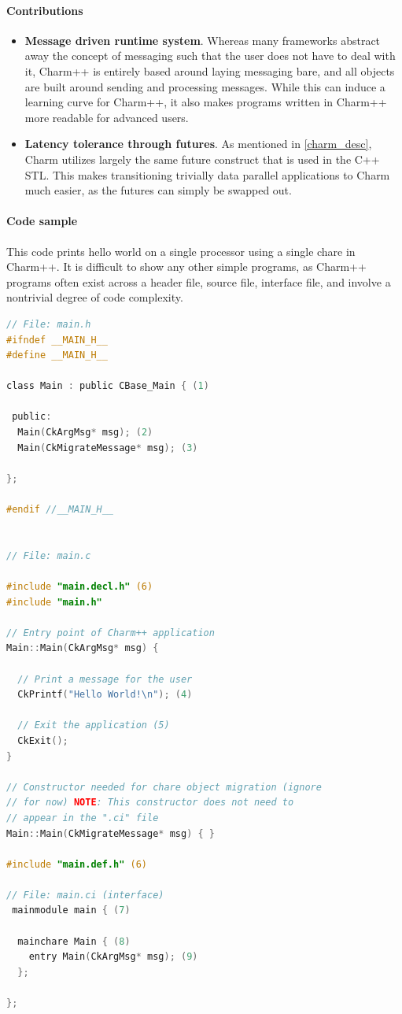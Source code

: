\paragraph{Contributions}
	\begin{itemize}
		\item \textbf{Message driven runtime system}. Whereas many frameworks abstract away the concept of messaging such that the user does not have to deal with it, Charm++ is entirely based around laying messaging bare, and all objects are built around sending and processing messages. While this can induce a learning curve for Charm++, it also makes programs written in Charm++ more readable for advanced users.  
		\item \textbf{Latency tolerance through futures}. As mentioned in \ref{charm_desc}, Charm utilizes largely the same future construct that is used in the C++ STL. This makes transitioning trivially data parallel applications to Charm much easier, as the futures can simply be swapped out.   
		
	\end{itemize}

\paragraph{Code sample}
This code prints hello world on a single processor using a single chare in Charm++. It is difficult to show any other simple programs, as Charm++ programs often exist across a header file, source file, interface file, and involve a nontrivial degree of code complexity.
\scriptsize
\begin{lstlisting}[language=C, caption=Hello World in Charm++ from \cite{charm_tutorial}, captionpos=b]
// File: main.h
#ifndef __MAIN_H__
#define __MAIN_H__

class Main : public CBase_Main { (1)

 public:
  Main(CkArgMsg* msg); (2)
  Main(CkMigrateMessage* msg); (3)

};

#endif //__MAIN_H__


// File: main.c

#include "main.decl.h" (6)
#include "main.h"

// Entry point of Charm++ application
Main::Main(CkArgMsg* msg) {

  // Print a message for the user
  CkPrintf("Hello World!\n"); (4)

  // Exit the application (5)
  CkExit();
}

// Constructor needed for chare object migration (ignore
// for now) NOTE: This constructor does not need to
// appear in the ".ci" file
Main::Main(CkMigrateMessage* msg) { }

#include "main.def.h" (6)
	
// File: main.ci (interface)
 mainmodule main { (7)

  mainchare Main { (8)
    entry Main(CkArgMsg* msg); (9)
  };

};

\end{lstlisting}%

